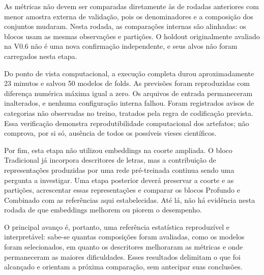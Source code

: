 As métricas não devem ser comparadas diretamente às de rodadas anteriores com menor amostra externa de validação, pois os denominadores e a composição dos conjuntos mudaram. Nesta rodada, as comparações internas são alinhadas: os blocos usam as mesmas observações e partições. O holdout originalmente avaliado na V0.6 não é uma nova confirmação independente, e seus alvos não foram carregados nesta etapa.

Do ponto de vista computacional, a execução completa durou aproximadamente 23 minutos e salvou 50 modelos de folds. As previsões foram reproduzidas com diferença numérica máxima igual a zero. Os arquivos de entrada permaneceram inalterados, e nenhuma configuração interna falhou. Foram registrados avisos de categorias não observadas no treino, tratados pela regra de codificação prevista. Essa verificação demonstra reprodutibilidade computacional dos artefatos; não comprova, por si só, ausência de todos os possíveis vieses científicos.

Por fim, esta etapa não utilizou embeddings na coorte ampliada. O bloco Tradicional já incorpora descritores de letras, mas a contribuição de representações produzidas por uma rede pré-treinada continua sendo uma pergunta a investigar. Uma etapa posterior deverá preservar a coorte e as partições, acrescentar essas representações e comparar os blocos Profundo e Combinado com as referências aqui estabelecidas. Até lá, não há evidência nesta rodada de que embeddings melhorem ou piorem o desempenho.

O principal avanço é, portanto, uma referência estatística reproduzível e interpretável: sabe-se quantas composições foram avaliadas, como os modelos foram selecionados, em quanto os descritores melhoraram as métricas e onde permaneceram as maiores dificuldades. Esses resultados delimitam o que foi alcançado e orientam a próxima comparação, sem antecipar suas conclusões.
